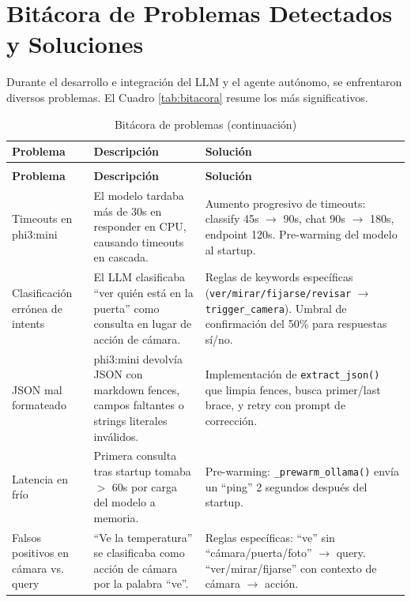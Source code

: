 \documentclass[12pt,letterpaper]{article}
\begin{document}
\section{Bitácora de Problemas Detectados y Soluciones}

Durante el desarrollo e integración del LLM y el agente autónomo, se enfrentaron diversos problemas. El Cuadro \ref{tab:bitacora} resume los más significativos.

{\small
\setlength{\LTleft}{0pt plus 1fill}
\setlength{\LTright}{0pt plus 1fill}
\begin{longtable}{p{2.5cm}p{4.5cm}p{5cm}}
    \caption{Bitácora de problemas del LLM y soluciones aplicadas.} \\
    \toprule
    \textbf{Problema} & \textbf{Descripción} & \textbf{Solución} \\
    \midrule
    \endfirsthead
    \caption[]{Bitácora de problemas (continuación)} \\
    \toprule
    \textbf{Problema} & \textbf{Descripción} & \textbf{Solución} \\
    \midrule
    \endhead
    \bottomrule
    \endfoot
    Timeouts en phi3:mini & El modelo tardaba más de 30s en responder en CPU, causando timeouts en cascada. & Aumento progresivo de timeouts: classify 45s $\rightarrow$ 90s, chat 90s $\rightarrow$ 180s, endpoint 120s. Pre-warming del modelo al startup. \\
    \midrule
    Clasificación errónea de intents & El LLM clasificaba ``ver quién está en la puerta'' como consulta en lugar de acción de cámara. & Reglas de keywords específicas (\mbox{\texttt{ver/mirar/fijarse/revisar}} $\rightarrow$ \mbox{\texttt{trigger\_camera}}). Umbral de confirmación del 50\% para respuestas sí/no. \\
    \midrule
    JSON mal formateado & phi3:mini devolvía JSON con markdown fences, campos faltantes o strings literales inválidos. & Implementación de \mbox{\texttt{extract\_json()}} que limpia fences, busca primer/last brace, y retry con prompt de corrección. \\
    \midrule
    Latencia en frío & Primera consulta tras startup tomaba $>$ 60s por carga del modelo a memoria. & Pre-warming: \mbox{\texttt{\_prewarm\_ollama()}} envía un ``ping'' 2 segundos después del startup. \\
    \midrule
    Falsos positivos en cámara vs. query & ``Ve la temperatura'' se clasificaba como acción de cámara por la palabra ``ve''. & Reglas específicas: ``ve'' sin ``cámara/puerta/foto'' $\rightarrow$ query. ``ver/mirar/fijarse'' con contexto de cámara $\rightarrow$ acción. \\

\end{longtable}}
\end{document}
